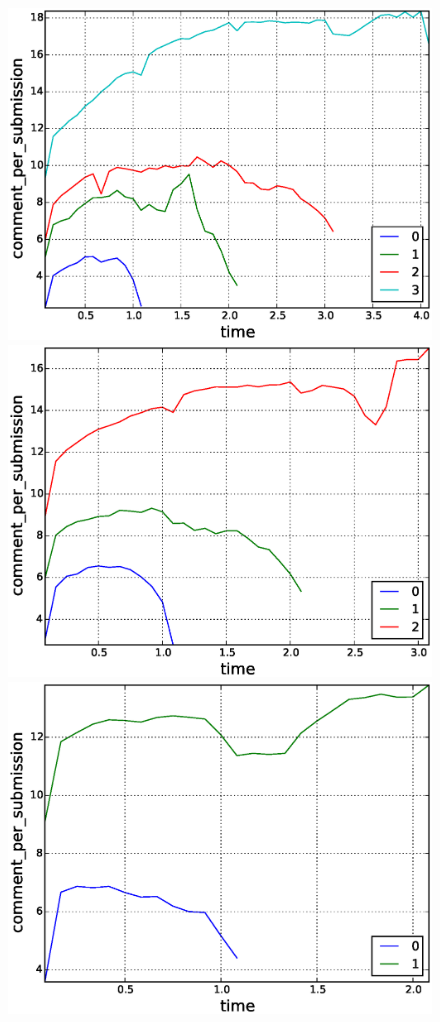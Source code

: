 \begin{figure}[!tb]
\includegraphics[scale=0.2]{./images/comments_per_submissions_for_surviving_year_for_2011.eps}
\includegraphics[scale=0.2]{./images/comments_per_submissions_for_surviving_year_for_2012.eps}
\includegraphics[scale=0.2]{./images/comments_per_submissions_for_surviving_year_for_2013.eps}

\end{figure}
